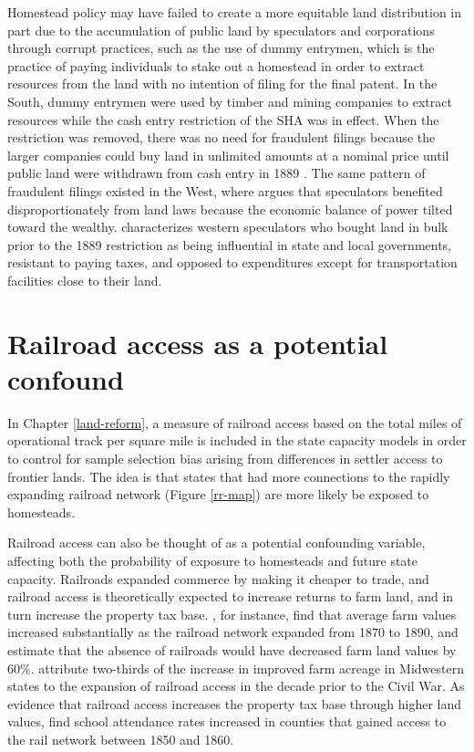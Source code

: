 Homestead policy may have failed to create a more equitable land distribution in part due to the accumulation of public land by speculators and corporations through corrupt practices, such as the use of dummy entrymen, which is the practice of paying individuals to stake out a homestead in order to extract resources from the land with no intention of filing for the final patent. In the South, dummy entrymen were used by timber and mining companies to extract resources while the cash entry restriction of the SHA was in effect. When the restriction was removed, there was no need for fraudulent filings because the larger companies could buy land in unlimited amounts at a nominal price until public land were withdrawn from cash entry in 1889 \citep{gates1940federal,gates1979federal}. The same pattern of fraudulent filings existed in the West, where \citet{murtazashvili2013political} argues that speculators benefited disproportionately from land laws because the economic balance of power tilted toward the wealthy. \citet{gates1942role} characterizes western speculators who bought land in bulk prior to the 1889 restriction as being influential in state and local governments, resistant to paying taxes, and opposed to expenditures except for transportation facilities close to their land.

\section{Railroad access as a potential confound} 

In Chapter \ref{land-reform}, a measure of railroad access based on the total miles of operational track per square mile is included in the state capacity models in order to control for sample selection bias arising from differences in settler access to frontier lands. The idea is that states that had more connections to the rapidly expanding railroad network (Figure \ref{rr-map}) are more likely be exposed to homesteads. 

Railroad access can also be thought of as a potential confounding variable, affecting both the probability of exposure to homesteads and future state capacity. Railroads expanded commerce by making it cheaper to trade, and railroad access is theoretically expected to increase returns to farm land, and in turn increase the property tax base. \citet{donaldson2016railroads}, for instance, find that average farm values increased substantially as the railroad network expanded from 1870 to 1890, and estimate that the absence of railroads would have decreased farm land values by 60\%. \citet{atack2011impact} attribute two-thirds of the increase in improved farm acreage in Midwestern states to the expansion of railroad access in the decade prior to the Civil War. As evidence that railroad access increases the property tax base through higher land values, \citet{atack2012impact} find school attendance rates increased in counties that gained access to the rail network between 1850 and 1860.

